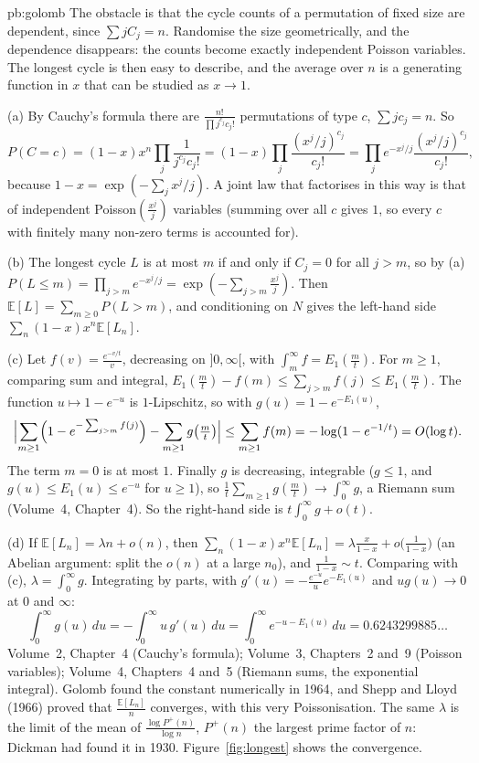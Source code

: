 \begin{solution}{pb:golomb}
\idea The obstacle is that the cycle counts of a permutation of fixed size are dependent, since $\sum jC_j=n$. Randomise the size
geometrically, and the dependence disappears: the counts become exactly independent Poisson variables. The longest cycle is then
easy to describe, and the average over $n$ is a generating function in $x$ that can be studied as $x\to1$.

\writeup (a) By Cauchy's formula there are $\frac{n!}{\prod j^{c_j}c_j!}$ permutations of type $c$, $\sum jc_j=n$. So
\[
P(C=c)=(1-x)x^n\prod_j\frac1{j^{c_j}c_j!}=(1-x)\prod_j\frac{(x^j/j)^{c_j}}{c_j!}=\prod_je^{-x^j/j}\frac{(x^j/j)^{c_j}}{c_j!},
\]
because $1-x=\exp(-\sum_jx^j/j)$. A joint law that factorises in this way is that of independent Poisson$(\frac{x^j}j)$
variables (summing over all $c$ gives $1$, so every $c$ with finitely many non-zero terms is accounted for).

(b) The longest cycle $L$ is at most $m$ if and only if $C_j=0$ for all $j>m$, so by (a)
$P(L\le m)=\prod_{j>m}e^{-x^j/j}=\exp(-\sum_{j>m}\frac{x^j}j)$. Then $\mathbb E[L]=\sum_{m\ge0}P(L>m)$, and conditioning on $N$
gives the left-hand side $\sum_n(1-x)x^n\mathbb E[L_n]$.

(c) Let $f(v)=\frac{e^{-v/t}}v$, decreasing on $]0,\infty[$, with $\int_m^\infty f=E_1(\frac mt)$. For $m\ge1$, comparing sum and
integral, $E_1(\frac mt)-f(m)\le\sum_{j>m}f(j)\le E_1(\frac mt)$. The function $u\mapsto1-e^{-u}$ is $1$-Lipschitz, so with
$g(u)=1-e^{-E_1(u)}$,
\[
\Bigl|\sum_{m\ge1}\Bigl(1-e^{-\sum_{j>m}f(j)}\Bigr)-\sum_{m\ge1}g\bigl(\tfrac mt\bigr)\Bigr|\le\sum_{m\ge1}f(m)=-\log(1-e^{-1/t})=O(\log t).
\]
The term $m=0$ is at most $1$. Finally $g$ is decreasing, integrable ($g\le1$, and $g(u)\le E_1(u)\le e^{-u}$ for $u\ge1$), so
$\frac1t\sum_{m\ge1}g(\frac mt)\to\int_0^\infty g$, a Riemann sum (Volume~4, Chapter~4). So the right-hand side is
$t\int_0^\infty g+o(t)$.

(d) If $\mathbb E[L_n]=\lambda n+o(n)$, then $\sum_n(1-x)x^n\mathbb E[L_n]=\lambda\frac x{1-x}+o\bigl(\frac1{1-x}\bigr)$ (an
Abelian argument: split the $o(n)$ at a large $n_0$), and $\frac1{1-x}\sim t$. Comparing with (c), $\lambda=\int_0^\infty g$.
Integrating by parts, with $g'(u)=-\frac{e^{-u}}ue^{-E_1(u)}$ and $ug(u)\to0$ at $0$ and $\infty$:
\[
\int_0^\infty g(u)\,du=-\int_0^\infty u\,g'(u)\,du=\int_0^\infty e^{-u-E_1(u)}\,du=0.6243299885\ldots
\]
\tools Volume~2, Chapter~4 (Cauchy's formula); Volume~3, Chapters~2 and~9 (Poisson variables); Volume~4, Chapters~4 and~5 (Riemann sums,
the exponential integral).
\leads Golomb found the constant numerically in 1964, and Shepp and Lloyd (1966) proved that $\frac{\mathbb E[L_n]}n$ converges,
with this very Poissonisation. The same $\lambda$ is the limit of the mean of $\frac{\log P^+(n)}{\log n}$, $P^+(n)$ the largest prime
factor of $n$: Dickman had found it in 1930. Figure~\ref{fig:longest} shows the convergence.
\end{solution}

